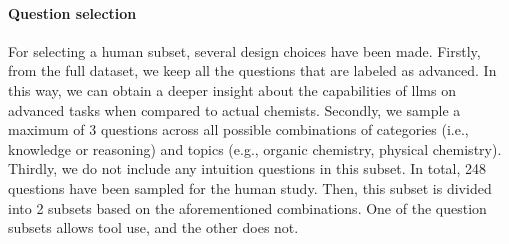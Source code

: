 \paragraph{Question selection}

For selecting a human subset, several design choices have been made. Firstly, from the full dataset, we keep all the questions that are labeled as advanced. In this way, we can obtain a deeper insight about the capabilities of \glspl{llm} on advanced tasks
when compared to actual chemists. Secondly, we sample a maximum of 3 questions across all possible combinations of categories (i.e., knowledge or reasoning) and topics (e.g., organic chemistry, physical chemistry). Thirdly, we do not include any intuition questions
in this subset. In total, 248 questions have been sampled for the human study. Then, this subset is divided into 2 subsets based on the aforementioned combinations. One of the question subsets allows tool use, and the other does not.
